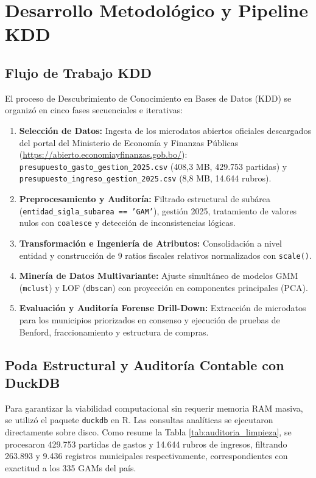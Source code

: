 \documentclass[11pt,a4paper]{article}
\begin{document}
\section{Desarrollo Metodológico y Pipeline KDD}

\subsection{Flujo de Trabajo KDD}
El proceso de Descubrimiento de Conocimiento en Bases de Datos (KDD) \citep{fayyad1996kdd} se organizó en cinco fases secuenciales e iterativas:
\begin{enumerate}[label=\textbf{\arabic*.}]
    \item \textbf{Selección de Datos:} Ingesta de los microdatos abiertos oficiales descargados del portal del Ministerio de Economía y Finanzas Públicas \citep{mefp_datosabiertos} (\url{https://abierto.economiayfinanzas.gob.bo/}): \texttt{presupuesto\_gasto\_gestion\_2025.csv} (408,3 MB, 429.753 partidas) y \texttt{presupuesto\_ingreso\_gestion\_2025.csv} (8,8 MB, 14.644 rubros).
    \item \textbf{Preprocesamiento y Auditoría:} Filtrado estructural de subárea (\texttt{entidad\_sigla\_subarea == 'GAM'}), gestión 2025, tratamiento de valores nulos con \texttt{coalesce} y detección de inconsistencias lógicas.
    \item \textbf{Transformación e Ingeniería de Atributos:} Consolidación a nivel entidad y construcción de 9 ratios fiscales relativos normalizados con \texttt{scale()}.
    \item \textbf{Minería de Datos Multivariante:} Ajuste simultáneo de modelos GMM (\texttt{mclust}) y LOF (\texttt{dbscan}) con proyección en componentes principales (PCA).
    \item \textbf{Evaluación y Auditoría Forense Drill-Down:} Extracción de microdatos para los municipios priorizados en consenso y ejecución de pruebas de Benford, fraccionamiento y estructura de compras.
\end{enumerate}

\subsection{Poda Estructural y Auditoría Contable con DuckDB}
Para garantizar la viabilidad computacional sin requerir memoria RAM masiva, se utilizó el paquete \texttt{duckdb} en R. Las consultas analíticas se ejecutaron directamente sobre disco. Como resume la Tabla \ref{tab:auditoria_limpieza}, se procesaron 429.753 partidas de gastos y 14.644 rubros de ingresos, filtrando 263.893 y 9.436 registros municipales respectivamente, correspondientes con exactitud a los 335 GAMs del país.
\end{document}
